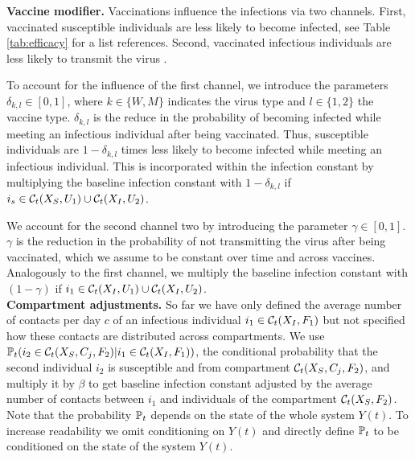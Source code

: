 \textbf{Vaccine modifier.} Vaccinations influence the infections via two channels. First, vaccinated susceptible individuals are less likely to become infected, see Table \ref{tab:efficacy} for a list references. Second, vaccinated infectious individuals are less likely to transmit the virus \citep{Harris.2021}.

To account for the influence of the first channel, we introduce the parameters $\delta_{k,l} \in [0,1]$, where $k \in \{W, M\}$ indicates the virus type and $l \in \{ 1,2\}$ the vaccine type. $\delta_{k,l}$ is the reduce in the probability of becoming infected while meeting an infectious individual after being vaccinated. Thus, susceptible individuals are $1 - \delta_{k,l}$ times less likely to become infected while meeting an infectious individual. This is incorporated within the infection constant by multiplying the baseline infection constant with $1 - \delta_{k,l}$ if $i_s \in \mathcal{C}_t(X_S, U_1) \cup \mathcal{C}_t(X_I, U_2)$.

We account for the second channel two by introducing the parameter $\gamma \in [0,1]$. $\gamma$ is the reduction in the probability of not transmitting the virus after being vaccinated, which we assume to be constant over time and across vaccines. Analogously to the first channel, we  multiply the baseline infection constant with $(1 - \gamma)$ if $i_1 \in \mathcal{C}_t(X_I, U_1) \cup \mathcal{C}_t(X_I, U_2)$.  \\

\textbf{Compartment adjustments.} So far we have only defined the average number of contacts per day $c$ of an infectious individual $i_1 \in \mathcal{C}_t(X_I, F_1)$ but not specified how these contacts are distributed across compartments. We use $\mathbb{P}_t(i_2 \in \mathcal{C}_t(X_S, C_j, F_2) | i_1 \in \mathcal{C}_t(X_I, F_1))$, the conditional probability that the second individual $i_2$ is susceptible and from compartment $\mathcal{C}_t(X_S, C_j, F_2)$, and multiply it by $\beta$ to get baseline infection constant adjusted by the average number of contacts between $i_1$ and individuals of the compartment $\mathcal{C}_t(X_S, F_2)$. Note that the probability $\mathbb{P}_t$ depends on the state of the whole system $Y(t)$. To increase readability we omit conditioning on $Y(t)$ and directly define $\mathbb{P}_t$ to be conditioned on the state of the system $Y(t)$.


